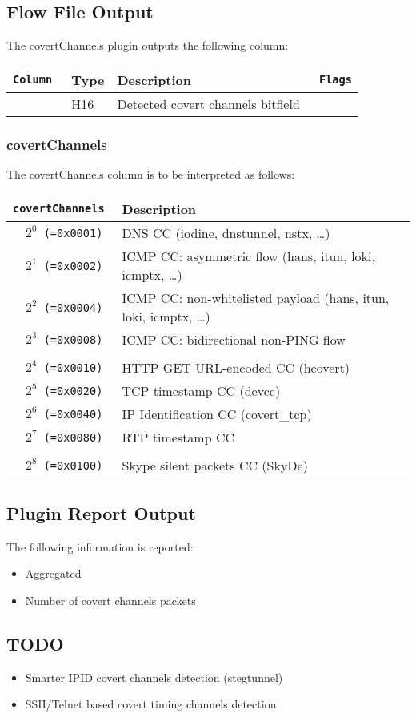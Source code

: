 \documentclass[documentation]{subfiles}
\begin{document}
\subsection{Flow File Output}
The covertChannels plugin outputs the following column:
\begin{longtable}{>{\tt}lll>{\tt\small}l}
    \toprule
    {\bf Column} & {\bf Type} & {\bf Description} & {\bf Flags}\\
    \midrule\endhead%
    \nameref{covertChannels} & H16 & Detected covert channels bitfield & \\
    \bottomrule
\end{longtable}

\subsubsection{covertChannels}\label{covertChannels}
The covertChannels column is to be interpreted as follows:
\begin{longtable}{>{\tt}rl}
    \toprule
    {\bf covertChannels} & {\bf Description} \\
    \midrule\endhead%
    $2^0$ (=0x0001) & DNS CC (iodine, dnstunnel, nstx, \ldots)\\
    $2^1$ (=0x0002) & ICMP CC: asymmetric flow (hans, itun, loki, icmptx, \ldots)\\
    $2^2$ (=0x0004) & ICMP CC: non-whitelisted payload (hans, itun, loki, icmptx, \ldots)\\
    $2^3$ (=0x0008) & ICMP CC: bidirectional non-PING flow \\
    \\
    $2^4$ (=0x0010) & HTTP GET URL-encoded CC (hcovert)\\
    $2^5$ (=0x0020) & TCP timestamp CC (devcc)\\
    $2^6$ (=0x0040) & IP Identification CC (covert\_tcp)\\
    $2^7$ (=0x0080) & RTP timestamp CC\\
    \\
    $2^8$ (=0x0100) & Skype silent packets CC (SkyDe)\\
    \bottomrule
\end{longtable}

\subsection{Plugin Report Output}
The following information is reported:
\begin{itemize}
    \item Aggregated {\tt{}}
    \item Number of covert channels packets
\end{itemize}

\subsection{TODO}

\begin{itemize}
    \item Smarter IPID covert channels detection (stegtunnel)
    \item SSH/Telnet based covert timing channels detection
\end{itemize}
\end{document}
